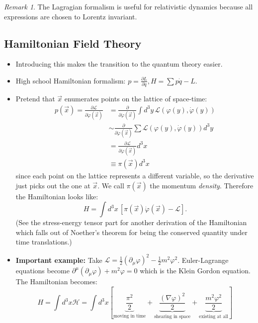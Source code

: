 \documentclass{report}
\theoremstyle{plain}
\theoremstyle{definition}
\theoremstyle{remark}
\newtheorem*{remark}{Remark}
\newcommand{\FR}[2]{\frac{#1}{#2}}
\newcommand{\mc}{\mathcal}
\newcommand{\vphi}{\varphi}
\newcommand{\di}{\partial}
\newcommand{\ddi}[2]{\FR{\partial {#1}}{\partial {#2}}}
\begin{document}
\begin{itemize}
    \begin{remark}
        The Lagragian formalism is useful for relativistic dynamics because
        all expressions are chosen to Lorentz invariant.
    \end{remark}
    \end{itemize}
\subsection{Hamiltonian Field Theory}
    \begin{itemize}
\item Introducing this makes the transition to the quantum theory easier.
\item High school Hamiltonian formalism: 
    $p = \ddi{L}{\dot q},H=\sum p\dot q-L$.
\item Pretend that $\vec x$ enumerates points on the lattice of space-time:
    \begin{align*}
        p(\vec x) = \ddi{\mc L}{\dot\vphi(\vec x)}
        &= \ddi{}{\dot\vphi(\vec x)}\int d^3y\, \mc
        L(\vphi(y),\dot\vphi(y))\\
        &\sim \ddi{}{\dot\vphi(\vec x)}\sum \mc
        L(\vphi(y),\dot\vphi(y)) d^3y\\
        &= \ddi{\mc L}{\dot\vphi(\vec x)} d^3x\\
        &\equiv \pi(\vec x)d^3 x
    \end{align*}
    since each point on the lattice represents a different variable, so the
    derivative just picks out the one at $\vec x$. We call $\pi(\vec x)$
    the momentum \emph{density}. Therefore the Hamiltonian looks like:
    \[H = \int d^3x\, \left[\pi(\vec x)\dot\vphi(\vec x) - \mc L\right].\]
    (See the stress-energy tensor part for another derivation of the
    Hamiltonian which falls out of Noether's theorem for being the
    conserved quantity under time translations.)
\item \textbf{Important example:} Take $\mc L = \FR{1}{2}(\di_\mu\vphi)^2 -\FR{1}{2}
    m^2\vphi^2$. Euler-Lagrange equations become $\di^\mu(\di_\mu
    \vphi)+m^2\vphi=0$ which is the Klein Gordon equation. The Hamiltonian
    becomes:
    \[ H = \int d^3x \mc H
= \int d^3x \left[ \underbrace{\FR{\pi^2}{2}}_{\text{moving in time}}
    + \underbrace{\FR{(\nabla \vphi)^2}{2}}_{\text{shearing in space}}
+ \underbrace{\FR{m^2\vphi^2}{2}}_{\text{existing at all}}\right]\]
    \end{itemize}
\end{document}
